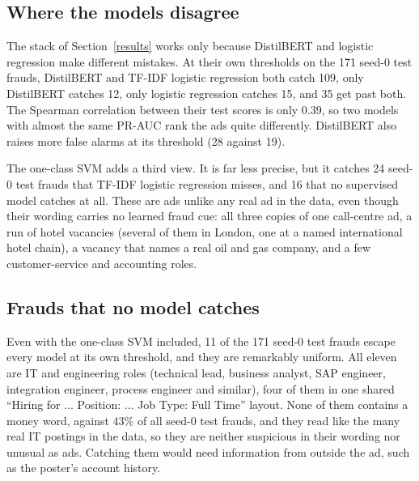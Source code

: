 \subsection{Where the models disagree}

The stack of Section~\ref{results} works only because DistilBERT and logistic regression make
different mistakes. At their own thresholds on the 171 seed-0 test frauds, DistilBERT and TF-IDF
logistic regression both catch 109, only DistilBERT catches 12, only logistic regression catches
15, and 35 get past both. The Spearman correlation between their test scores is only 0.39, so two
models with almost the same PR-AUC rank the ads quite differently. DistilBERT also raises more
false alarms at its threshold (28 against 19).

The one-class SVM adds a third view. It is far less precise, but it catches 24 seed-0 test frauds
that TF-IDF logistic regression misses, and 16 that no supervised model catches at all. These are
ads unlike any real ad in the data, even though their wording carries no learned fraud cue: all
three copies of one call-centre ad, a run of hotel vacancies (several of them in London, one at a
named international hotel chain), a vacancy that names a real oil and gas company, and a few
customer-service and accounting roles.

\subsection{Frauds that no model catches}

Even with the one-class SVM included, 11 of the 171 seed-0 test frauds escape every model at its
own threshold, and they are remarkably uniform. All eleven are IT and engineering roles (technical
lead, business analyst, SAP engineer, integration engineer, process engineer and similar), four of
them in one shared ``Hiring for ... Position: ... Job Type: Full Time'' layout. None of them
contains a money word, against 43\% of all seed-0 test frauds, and they read like the many real IT
postings in the data, so they are neither suspicious in their wording nor unusual as ads. Catching
them would need information from outside the ad, such as the poster's account history.
